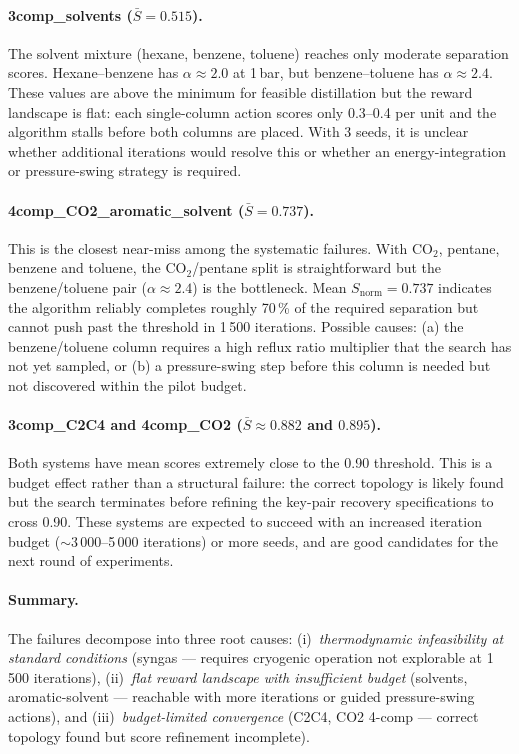 \documentclass[11pt,a4paper]{article}
\theoremstyle{definition}
\theoremstyle{plain}
\begin{document}
\paragraph{3comp\_solvents ($\bar{S} = 0.515$).}
The solvent mixture (hexane, benzene, toluene) reaches only moderate separation scores. Hexane--benzene has $\alpha \approx 2.0$ at 1\,bar, but benzene--toluene has $\alpha \approx 2.4$. These values are above the minimum for feasible distillation but the reward landscape is flat: each single-column action scores only 0.3--0.4 per unit and the algorithm stalls before both columns are placed. With 3 seeds, it is unclear whether additional iterations would resolve this or whether an energy-integration or pressure-swing strategy is required.

\paragraph{4comp\_CO2\_aromatic\_solvent ($\bar{S} = 0.737$).}
This is the closest near-miss among the systematic failures. With CO$_2$, pentane, benzene and toluene, the CO$_2$/pentane split is straightforward but the benzene/toluene pair ($\alpha \approx 2.4$) is the bottleneck. Mean $S_{\mathrm{norm}} = 0.737$ indicates the algorithm reliably completes roughly 70\,\% of the required separation but cannot push past the threshold in 1\,500 iterations. Possible causes: (a) the benzene/toluene column requires a high reflux ratio multiplier that the search has not yet sampled, or (b) a pressure-swing step before this column is needed but not discovered within the pilot budget.

\paragraph{3comp\_C2C4 and 4comp\_CO2 ($\bar{S} \approx 0.882$ and $0.895$).}
Both systems have mean scores extremely close to the 0.90 threshold. This is a budget effect rather than a structural failure: the correct topology is likely found but the search terminates before refining the key-pair recovery specifications to cross 0.90. These systems are expected to succeed with an increased iteration budget ($\sim 3\,000$--5\,000 iterations) or more seeds, and are good candidates for the next round of experiments.

\paragraph{Summary.}
The failures decompose into three root causes:
(i)~\emph{thermodynamic infeasibility at standard conditions} (syngas — requires cryogenic operation not explorable at 1\,500 iterations),
(ii)~\emph{flat reward landscape with insufficient budget} (solvents, aromatic-solvent — reachable with more iterations or guided pressure-swing actions), and
(iii)~\emph{budget-limited convergence} (C2C4, CO2 4-comp — correct topology found but score refinement incomplete).
\end{document}
